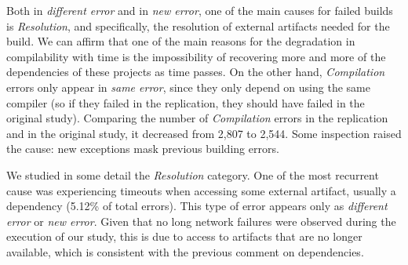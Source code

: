 Both in \textit{different error} and in \textit{new error}, one of the main causes for failed builds is \textit{Resolution}, and specifically, the resolution of external artifacts needed for the build. We can affirm that one of the main reasons for the degradation in compilability with time is the impossibility of recovering more and more of the dependencies of these projects as time passes. On the other hand, \textit{Compilation} errors only appear in \textit{same error}, since they only depend on using the same compiler (so if they failed in the replication, they should have failed in the original study). Comparing the number of \textit{Compilation} errors in the replication and in the original study, it decreased from 2,807 to 2,544. Some inspection raised the cause: new exceptions mask previous building errors.

We studied in some detail the \textit{Resolution} category. One of the most recurrent cause was experiencing timeouts when accessing some external artifact, usually a dependency (5.12\% of total errors). This type of error appears only as \textit{different error} or \textit{new error}. Given that no long network failures were observed during the execution of our study, this is due to access to artifacts that are no longer available, which is consistent with the previous comment on dependencies.

\vspace{0.5cm}

\newpage
